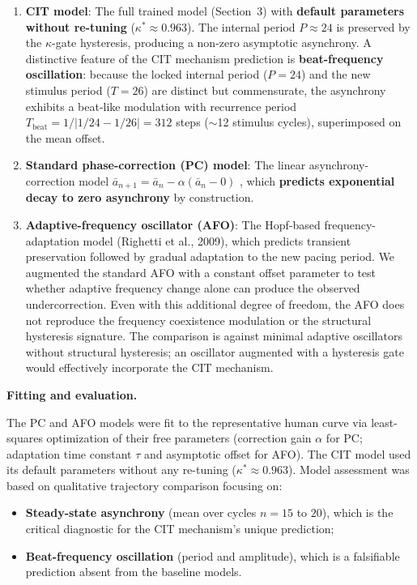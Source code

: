 \documentclass[12pt,a4paper]{article}
\begin{document}
\begin{enumerate}

    \item \textbf{CIT model}: The full trained model (Section~3) with \textbf{default parameters without re-tuning} ($\kappa^* \approx 0.963$). The internal period $P \approx 24$ is preserved by the $\kappa$-gate hysteresis, producing a non-zero asymptotic asynchrony. A distinctive feature of the CIT mechanism prediction is \textbf{beat-frequency oscillation}: because the locked internal period ($P=24$) and the new stimulus period ($T=26$) are distinct but commensurate, the asynchrony exhibits a beat-like modulation with recurrence period $T_{\mathrm{beat}} = 1/|1/24 - 1/26| = 312$ steps ($\sim$12 stimulus cycles), superimposed on the mean offset.

    \item \textbf{Standard phase-correction (PC) model}: The linear asynchrony-correction model $\bar{a}_{n+1} = \bar{a}_n - \alpha(\bar{a}_n - 0)$ \cite{mates1994compensation}, which \textbf{predicts exponential decay to zero asynchrony} by construction.

    \item \textbf{Adaptive-frequency oscillator (AFO)}: The Hopf-based frequency-adaptation model (Righetti et al., 2009), which predicts transient preservation followed by gradual adaptation to the new pacing period. We augmented the standard AFO with a constant offset parameter to test whether adaptive frequency change alone can produce the observed undercorrection. Even with this additional degree of freedom, the AFO does not reproduce the frequency coexistence modulation or the structural hysteresis signature. The comparison is against minimal adaptive oscillators without structural hysteresis; an oscillator augmented with a hysteresis gate would effectively incorporate the CIT mechanism.

\end{enumerate}



\textbf{Fitting and evaluation.}

The PC and AFO models were fit to the representative human curve via least-squares optimization of their free parameters (correction gain $\alpha$ for PC; adaptation time constant $\tau$ and asymptotic offset for AFO). The CIT model used its default parameters without any re-tuning ($\kappa^* \approx 0.963$). Model assessment was based on qualitative trajectory comparison focusing on:

\begin{itemize}

    \item \textbf{Steady-state asynchrony} (mean over cycles $n = 15$ to $20$), which is the critical diagnostic for the CIT mechanism's unique prediction;

    \item \textbf{Beat-frequency oscillation} (period and amplitude), which is a falsifiable prediction absent from the baseline models.

\end{itemize}
\end{document}
